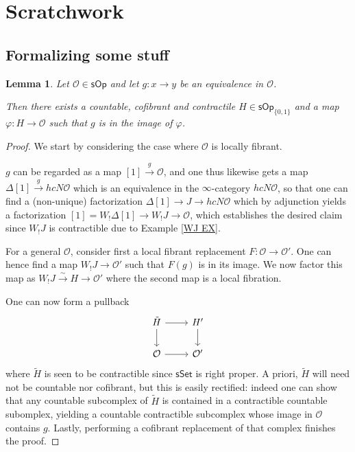 \documentclass[a4paper,10pt
,draft
]{article}%
\numberwithin{equation}{section}
\numberwithin{figure}{section}
\newtheorem{lemma}[equation]{Lemma}%
\theoremstyle{definition} %
\newcommand{\1}{\ensuremath{\mathbbm 1}}%
\begin{document}
\newpage

\section{Scratchwork}




\subsection{Formalizing some stuff}



\begin{lemma} \label{INTER_LEM}
Let $\mathcal{O} \in \mathsf{sOp}$ and let
$g \colon x \to y$ be an equivalence in $\mathcal{O}$.

Then there exists a countable, cofibrant and contractile $H \in \mathsf{sOp}_{\{0,1\}}$ 
and a map 
$\varphi \colon H \to \mathcal{O}$
such that 
$g$ is in the image of $\varphi$. 
\end{lemma}


\begin{proof}
	We start by considering the case where $\mathcal{O}$ is locally fibrant.
	
	$g$ can be regarded as a map
	$[1] \xrightarrow{g} \mathcal{O}$,
	and one thus likewise gets a map
	$\Delta[1] \xrightarrow{g}  hcN \mathcal{O}$
	which is an equivalence in the 
	$\infty$-category $hcN \mathcal{O}$,
	so that one can find a (non-unique) factorization
	$\Delta[1] \to J \to hcN \mathcal{O}$
	which by adjunction yields a factorization
	$[1]=W_!\Delta[1] \to W_! J \to \mathcal{O}$,
	which establishes the desired claim 
	since $W_! J$ is contractible due to 
	Example \ref{WJ EX}.
	
	For a general $\mathcal{O}$, 
	consider first a local fibrant replacement
	$F \colon \mathcal{O} \to \mathcal{O}'$.
	One can hence find a map 
	$W_! J \to \mathcal{O}'$ such that
	$F(g)$ is in its image. 
	We now factor this map as
	$W_! J \xrightarrow{\sim} H \to \mathcal{O}'$
	where the second map is a local fibration.
	
	One can now form a pullback
\[
\begin{tikzcd}
	\tilde{H} \ar{r} \ar{d} & H' \ar{d}
\\
	\mathcal{O} \ar{r} & \mathcal{O}'
\end{tikzcd}
\]
where $\tilde{H}$ is seen to be contractible since
$\mathsf{sSet}$ is right proper.
	A priori, $\tilde{H}$ will need not be countable nor cofibrant, but this is easily rectified:
	indeed one can show that any countable subcomplex of $\tilde{H}$ is contained in a contractible countable subomplex, 
	yielding a countable contractible subcomplex whose image in $\mathcal{O}$ contains $g$. Lastly, performing a cofibrant replacement of that complex finishes the proof.
\end{proof}
\end{document}
